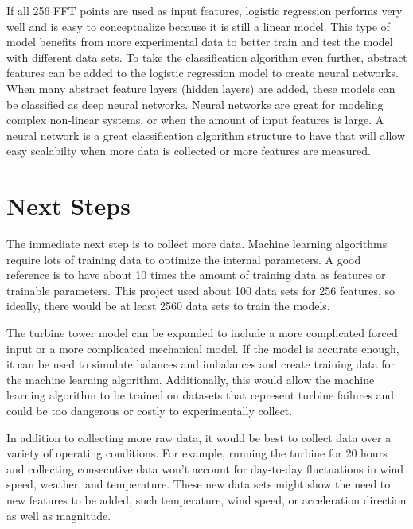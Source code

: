 If all 256 FFT points are used as input features, logistic regression performs very well and is easy to conceptualize because it is still a linear model.  This type of model benefits from more experimental data to better train and test the model with different data sets.  To take the classification algorithm even further, abstract features can be added to the logistic regression model to create neural networks.  When many abstract feature layers (hidden layers) are added, these models can be classified as deep neural networks.  Neural networks are great for modeling complex non-linear systems, or when the amount of input features is large.  A neural network is a great classification algorithm structure to have that will allow easy scalabilty when more data is collected or more features are measured.


\section{Next Steps}
The immediate next step is to collect more data.  Machine learning algorithms require lots of training data to optimize the internal parameters.  A good reference is to have about 10 times the amount of training data as features or trainable parameters.  This project used about 100 data sets for 256 features, so ideally, there would be at least 2560 data sets to train the models.

The turbine tower model can be expanded to include a more complicated forced input or a more complicated mechanical model.  If the model is accurate enough, it can be used to simulate balances and imbalances and create training data for the machine learning algorithm.  Additionally, this would allow the machine learning algorithm to be trained on datasets that represent turbine failures and could be too dangerous or costly to experimentally collect.

In addition to collecting more raw data, it would be best to collect data over a variety of operating conditions.  For example, running the turbine for 20 hours and collecting consecutive data won't account for day-to-day fluctuations in wind speed, weather, and temperature.  These new data sets might show the need to new features to be added, such temperature, wind speed, or acceleration direction as well as magnitude.

